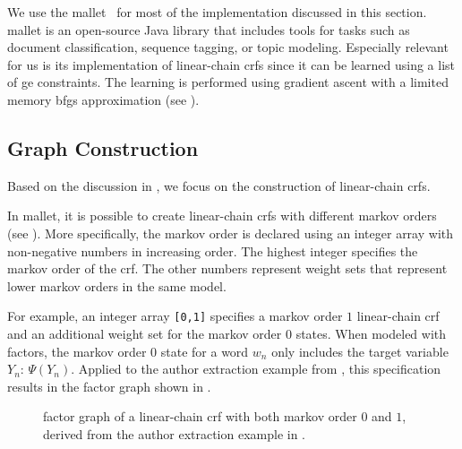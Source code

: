 We use the \acrfull{mallet}~\citep{mccallum2002mallet} for most of the implementation discussed in this section.
\gls{mallet} is an open-source Java library that includes tools for tasks such as document classification, sequence tagging, or topic modeling.
Especially relevant for us is its implementation of \glspl{linear-chain crf} since it can be learned using a list of \gls{ge} constraints.
The learning is performed using gradient ascent with a limited memory \gls{bfgs} approximation (see ).

\subsection{Graph Construction}\label{subsec:i-graph-construction}

Based on the discussion in , we focus on the construction of \glspl{linear-chain crf}.

In \gls{mallet}, it is possible to create \glspl{linear-chain crf} with different \glspl{markov order} (see ).
More specifically, the \gls{markov order} is declared using an integer array with non-negative numbers in increasing order.
The highest integer specifies the \gls{markov order} of the \gls{crf}.
The other numbers represent weight sets that represent lower \glspl{markov order} in the same model.

For example, an integer array \texttt{[0,1]} specifies a \gls{markov order} $1$ \gls{linear-chain crf} and an additional weight set for the \gls{markov order} $0$ states.
When modeled with \glspl{factor}, the \gls{markov order} $0$ state for a word $w_n$ only includes the \gls{target variable} $Y_n$: $\Psi(Y_n)$.
Applied to the author extraction example from , this specification results in the \gls{factor graph} shown in .
\begin{figure}[t]
\centering

\caption{%
  \Gls{factor graph} of a \gls{linear-chain crf} with both \gls{markov order} $0$ and $1$, derived from the author extraction example in .}
\label{fig:example-linear-chain-crf-markov-order-0-1}
\end{figure}


